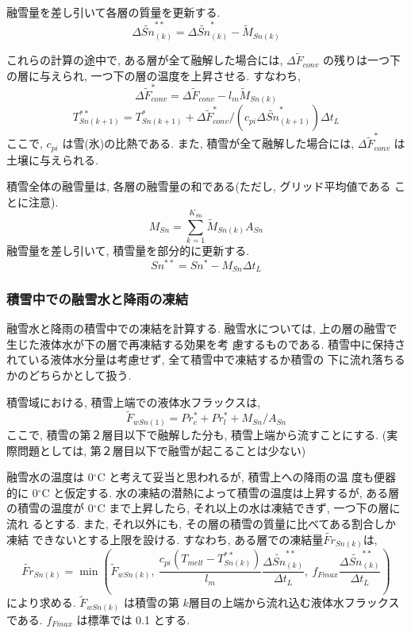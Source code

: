 融雪量を差し引いて各層の質量を更新する. 
\begin{equation}
 \Delta \widetilde{Sn}_{(k)}^{**} = \Delta \widetilde{Sn}_{(k)}^{*} 
 - \widetilde{M}_{Sn(k)}
\end{equation}

これらの計算の途中で, ある層が全て融解した場合には, 
$\Delta \widetilde{F}_{conv}$ の残りは一つ下の層に与えられ, 
一つ下の層の温度を上昇させる. すなわち, 
\begin{equation}
 \Delta \widetilde{F}_{conv}^* = \Delta \widetilde{F}_{conv} - l_m \widetilde{M}_{Sn(k)}
\end{equation}
\begin{equation}
 T_{Sn(k+1)}^{**} = T_{Sn(k+1)}^{*} + \Delta \widetilde{F}_{conv}^* / (c_{pi} \Delta \widetilde{Sn}_{(k+1)}^*) \Delta t_L
\end{equation}
ここで, $c_{pi}$ は雪(氷)の比熱である. 
また, 積雪が全て融解した場合には, 
 $\Delta \widetilde{F}_{conv}^*$ は土壌に与えられる. 

積雪全体の融雪量は, 各層の融雪量の和である(ただし, グリッド平均値である
ことに注意). 
\begin{equation}
 M_{Sn} = \sum_{k=1}^{K_{Sn}} \widetilde{M}_{Sn(k)} A_{Sn}
\end{equation}
融雪量を差し引いて, 積雪量を部分的に更新する. 
\begin{equation}
 Sn^{**} = Sn^{*} - M_{Sn} \Delta t_L
\end{equation}

\subsubsection{積雪中での融雪水と降雨の凍結}

融雪水と降雨の積雪中での凍結を計算する. 
融雪水については, 上の層の融雪で生じた液体水が下の層で再凍結する効果を考
慮するものである. 
積雪中に保持されている液体水分量は考慮せず, 全て積雪中で凍結するか積雪の
下に流れ落ちるかのどちらかとして扱う. 

積雪域における, 積雪上端での液体水フラックスは, 
\begin{equation}
 \widetilde{F}_{wSn(1)} = Pr_c^* + Pr_l^* + M_{Sn} / A_{Sn}
\end{equation}
ここで, 積雪の第２層目以下で融解した分も, 積雪上端から流すことにする. 
(実際問題としては, 第２層目以下で融雪が起こることは少ない)

融雪水の温度は 0$^{\circ}$C と考えて妥当と思われるが, 積雪上への降雨の温
度も便器的に 0$^{\circ}$C と仮定する. 
水の凍結の潜熱によって積雪の温度は上昇するが, ある層の積雪の温度が
0$^{\circ}$C まで上昇したら, それ以上の水は凍結できず, 一つ下の層に流れ
るとする. また, それ以外にも, その層の積雪の質量に比べてある割合しか凍結
できないとする上限を設ける. すなわち, ある層での凍結量$\widetilde{Fr}_{Sn(k)}$は, 
\begin{equation}
 \widetilde{Fr}_{Sn(k)} = \min\left( \widetilde{F}_{wSn(k)}, \ 
\frac{c_{pi}(T_{melt}-T_{Sn(k)}^{**})}{l_m}
\frac{\Delta \widetilde{Sn}_{(k)}^{**}}{\Delta t_L} , \ 
f_{Fmax}\frac{\Delta \widetilde{Sn}_{(k)}^{**}}{\Delta t_L} \right)
\end{equation}
により求める. 
$\widetilde{F}_{wSn(k)}$ は積雪の第 $k$層目の上端から流れ込む液体水フラックスである. 
$f_{Fmax}$ は標準では 0.1 とする. 

